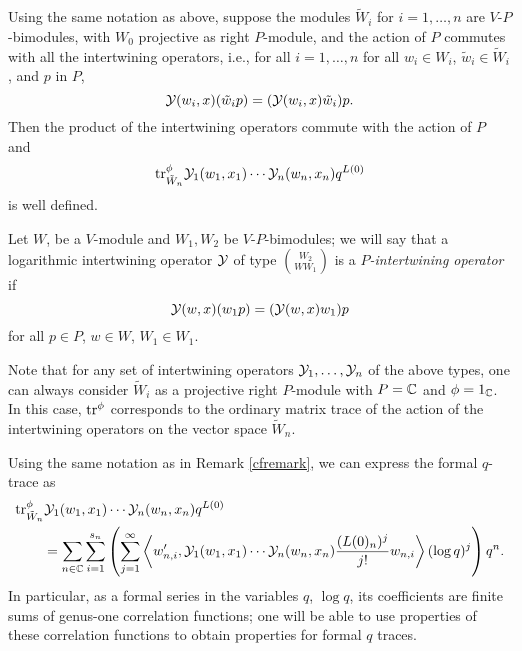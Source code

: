 \documentclass[12pt]{article}
\begin{document}
\begin{rema}{\rm
  Using the same notation as above, suppose the modules $\tilde W_i$ for $i=1,\ldots,n$
  are $V$-$P$-bimodules, with $W_0$ projective as right $P$-module, and the action
  of $P$ commutes with all the intertwining operators, i.e., for all $i=1,\ldots,n$
  for all $w_i\in W_i$, $\tilde w_i \in \tilde W_i$, and $p$ in $P$,
  $$
    \mathcal{Y}(w_i, x) (\tilde w_ip) = (\mathcal{Y}(w_i, x)\tilde w_i)p.
  $$
  Then the product of the intertwining operators commute with the action of $P$ and
  $$
    \mbox{\rm tr}^\phi_{\tilde W_n} \mathcal{Y}_1(w_1, x_1)\cdots\mathcal{Y}_n(w_n, x_n)q^{L(0)}
  $$
  is well defined.}
\end{rema}

\begin{defn}{\rm
  Let $W$, be a $V$-module and $W_1, W_2$ be $V$-$P$-bimodules; we will say that
  a logarithmic intertwining operator $\mathcal{Y}$ of type $\binom{W_2}{W W_1}$ is a
  \emph{$P$-intertwining operator} if
  $$
  \mathcal{Y}(w, x)(w_{1}p) = (\mathcal{Y}(w, x)w_1)p
  $$
  for all $p\in P$, $w\in W$, $W_1\in W_1$.
  }
\end{defn}

\begin{rema} {\rm
  Note that for any set of intertwining operators $\mathcal{Y}_1,\ldots,\mathcal{Y}_n$ of
  the above types, one can always consider $\tilde W_i$ as a projective
  right $P$-module with $P=\mathbb{C}$ and $\phi = 1_{\mathbb{C}}$. In this case, $\mbox{\rm tr}^\phi$
  corresponds to the ordinary matrix trace of the action of the intertwining
  operators on the vector space $\tilde W_n$.
}
\end{rema}

\begin{rema}
  {\rm
  Using the same notation as in Remark \ref{cfremark}, we can express the formal
  $q$-trace as
  \begin{align*}
    &\mbox{\rm tr}^\phi_{\tilde W_n} \mathcal{Y}_1(w_1, x_1)\cdots\mathcal{Y}_n(w_n, x_n)q^{L(0)} \nonumber \\
    &\qquad = \sum_{n\in \mathbb{C}} \sum_{i=1}^{s_n}\left( \sum_{j=1}^{\infty} 
          \left\langle w_{n,i}^\prime, 
            \mathcal{Y}_1(w_1, x_1)\cdots\mathcal{Y}_n(w_n, x_n)
            \frac{(L(0)_n)^j}{j!} w_{n,i}\right\rangle (\log q)^j \right) q^n.
  \end{align*}
  In particular, as a formal series in the variables $q$, $\log q$,
  its coefficients are finite sums of genus-one correlation functions; one
  will be able to use properties of these correlation functions to obtain
  properties for formal $q$ traces.
  }
\end{rema}
\end{document}
